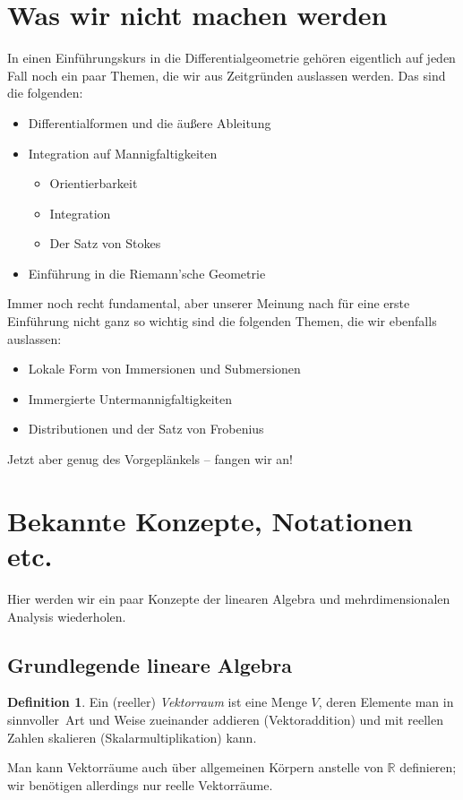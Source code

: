 \documentclass[a4paper]{scrbook}
\numberwithin{equation}{chapter}
\newcommand{\R}{\mathbb{R}}
\theoremstyle{definition}
\newtheorem{defn}{Definition}[section]
\begin{document}
\section{Was wir nicht machen werden}
In einen Einführungskurs in die Differentialgeometrie gehören eigentlich auf jeden Fall noch ein paar Themen, die wir aus Zeitgründen auslassen werden. Das sind die folgenden:
\begin{itemize}
	\item Differentialformen und die äußere Ableitung
	\item Integration auf Mannigfaltigkeiten
		\begin{itemize}
			\item Orientierbarkeit
			\item Integration
			\item Der Satz von Stokes
		\end{itemize}
	\item Einführung in die Riemann'sche Geometrie
\end{itemize}

Immer noch recht fundamental, aber unserer Meinung nach für eine erste Einführung nicht ganz so wichtig sind die folgenden Themen, die wir ebenfalls auslassen:
\begin{itemize}
	\item Lokale Form von Immersionen und Submersionen
	\item Immergierte Untermannigfaltigkeiten
	\item Distributionen und der Satz von Frobenius
\end{itemize}

Jetzt aber genug des Vorgeplänkels -- fangen wir an!

\section{Bekannte Konzepte, Notationen etc.}
Hier werden wir ein paar Konzepte der linearen Algebra und mehrdimensionalen Analysis wiederholen.

\subsection{Grundlegende lineare Algebra}

\begin{defn}
	Ein (reeller) \emph{Vektorraum} ist eine Menge $V$, deren Elemente man in \glqq sinnvoller\grqq\ Art und Weise zueinander addieren (\glqq Vektoraddition\grqq) und mit reellen Zahlen skalieren (\glqq Skalarmultiplikation\grqq) kann.
\end{defn}
Man kann Vektorräume auch über allgemeinen Körpern anstelle von $\R$ definieren; wir benötigen allerdings nur reelle Vektorräume.
\end{document}
